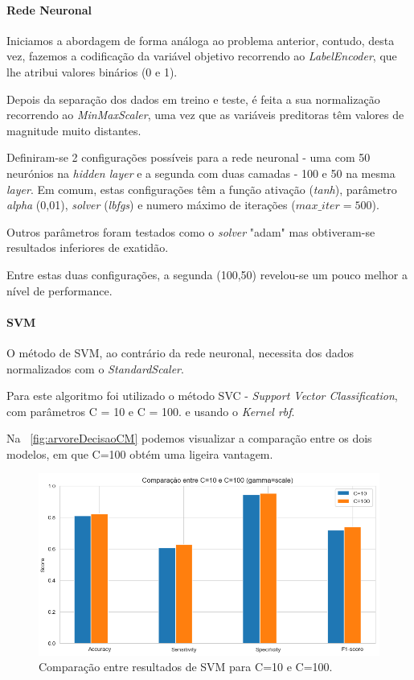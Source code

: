 \documentclass[conference]{IEEEtran}
\begin{document}
\medskip

\paragraph{Rede Neuronal}

Iniciamos a abordagem de forma análoga ao problema anterior, contudo, desta vez, fazemos a codificação da variável objetivo recorrendo ao \textit{LabelEncoder}, que lhe atribui valores binários (0 e 1).

Depois da separação dos dados em treino e teste, é feita a sua normalização recorrendo ao \textit{MinMaxScaler}, uma vez que as variáveis preditoras têm valores de magnitude muito distantes.

Definiram-se 2 configurações possíveis para a rede neuronal - uma com 50 neurónios na \textit{hidden layer} e a segunda com duas camadas - 100 e 50 na mesma \textit{layer}. Em comum, estas configurações têm a função ativação (\textit{tanh}), parâmetro \textit{alpha} (0,01), \textit{solver} (\textit{lbfgs}) e numero máximo de iterações ($max\_iter = 500$).

Outros parâmetros foram testados como o \textit{solver} "adam" mas obtiveram-se resultados inferiores de exatidão.

Entre estas duas configurações, a segunda (100,50) revelou-se um pouco melhor a nível de performance. 

\medskip

\paragraph{SVM}

O método de SVM, ao contrário da rede neuronal, necessita dos dados normalizados com o \textit{StandardScaler}. 

Para este algoritmo foi utilizado o método SVC - \textit{Support Vector Classification}, com parâmetros C = 10 e C = 100. e usando o \textit{Kernel rbf}.

Na \figurename~\ref{fig:arvoreDecisaoCM} podemos visualizar a comparação entre os dois modelos, em que C=100 obtém uma ligeira vantagem.

\begin{figure}[h]
	\centering
	\includegraphics[width=0.9\linewidth]{svm_compare}
	\caption{Comparação entre resultados de SVM para C=10 e C=100.}
	\label{fig:svm_compare}
\end{figure}
\end{document}
